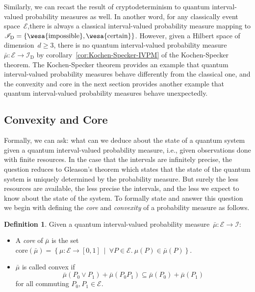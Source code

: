 \documentclass[12pt]{iopart}
\theoremstyle{plain}
\theoremstyle{definition}
\newtheorem{definition}[thm]{Definition}
\theoremstyle{remark}
\newcommand{\events}{\ensuremath{\mathcal{E}}}
\newcommand{\pmeas}{\ensuremath{\mu}}
\newcommand{\imposs}{{\mbox{\wesa{impossible}}}}
\newcommand{\necess}{{\mbox{\wesa{certain}}}}
\newcommand{\set}[2]{\ensuremath{\left\{ {#1}~\middle|~{#2}\right\} }}
\begin{document}
Similarly, we can recast the result of cryptodeterminism to quantum
interval-valued probability measures as well. In another word, for
any classically event space~$\events$,there is always a classical
interval-valued probability measure mapping to $\mathscr{I}_{\mathrm{D}}=\left\{ \imposs,\necess\right\} $.
However, given a Hilbert space of dimension~$d\ge3$, there is no
quantum interval-valued probability measure~$\bar{\mu}:\events\rightarrow\mathscr{I}_{\mathrm{D}}$
by corollary~\ref{cor:Kochen-Specker-IVPM} of the Kochen-Specker
theorem. The Kochen-Specker theorem provides an example that quantum
interval-valued probability measures behave differently from the classical
one, and the convexity and core in the next section provides another
example that quantum interval-valued probability measures behave unexpectedly.



\subsection{Convexity and Core}

\noindent Formally, we can ask: what can we deduce about the state
of a quantum system given a quantum interval-valued probability measure,
i.e., given observations done with finite resources. In the case that
the intervals are infinitely precise, the question reduces to Gleason's
theorem which states that the state of the quantum system is uniquely
determined by the probability measure. But surely the less resources
are available, the less precise the intervals, and the less we expect
to know about the state of the system. To formally state and answer
this question we begin with defining the \emph{core} and \emph{convexity}
of a probability measure as follows.

\begin{definition} Given a quantum interval-valued probability measure~$\bar{\mu}:\events\rightarrow\mathscr{I}$: 
\begin{itemize}
\item A \emph{core} of $\bar{\mu}$ is the set $\mathrm{core}\left(\bar{\mu}\right)=\set{\pmeas:\events\rightarrow[0,1]}{\forall P\in\events.~\pmeas\left(P\right)\in\bar{\mu}\left(P\right)}$. 
\item $\bar{\mu}$ is called convex if 
\begin{equation}
\bar{\mu}\left(P_{0}\vee P_{1}\right)+\bar{\mu}\left(P_{0}P_{1}\right)\subseteq\bar{\mu}\left(P_{0}\right)+\bar{\mu}\left(P_{1}\right)\label{eq:QuantumInterval-valuedProbability-Convex}
\end{equation}
for all commuting $P_{0},P_{1}\in\events$. 
\end{itemize}
\end{definition}
\end{document}
